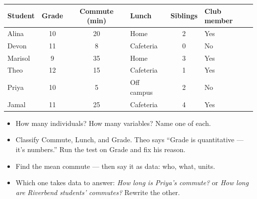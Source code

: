 \documentclass[aspectratio=169, 11pt]{beamer}
\begin{document}
\begin{frame}[t, plain]
  \vspace{2pt}
  \begin{center}
    \small
    \renewcommand{\arraystretch}{1.1}
    \begin{tabular}{@{} l c c l c l @{}}
    \hline
    \textbf{Student} & \textbf{Grade} & \textbf{Commute (min)} & \textbf{Lunch} &
      \textbf{Siblings} & \textbf{Club member} \\
    \hline
    Alina   & 10 & 20 & Home       & 2 & Yes \\
    Devon   & 11 &  8 & Cafeteria  & 0 & No  \\
    Marisol &  9 & 35 & Home       & 3 & Yes \\
    Theo    & 12 & 15 & Cafeteria  & 1 & Yes \\
    Priya   & 10 &  5 & Off campus & 2 & No  \\
    Jamal   & 11 & 25 & Cafeteria  & 4 & Yes \\
    \hline
    \end{tabular}
  \end{center}
  \vspace{4pt}
  \begin{itemize}\setlength{\itemsep}{3pt}
    \item[14.] How many individuals? How many variables? Name one of each.
    \item[15.] Classify Commute, Lunch, and Grade. Theo says ``Grade is quantitative ---
          it's numbers.'' Run the test on Grade and fix his reason.
    \item[16.] Find the mean commute --- then say it as data: who, what, units.
    \item[17.] Which one takes data to answer: \emph{How long is Priya's commute?} or
          \emph{How long are Riverbend students' commutes?} Rewrite the other.
  \end{itemize}
\end{frame}
\end{document}
